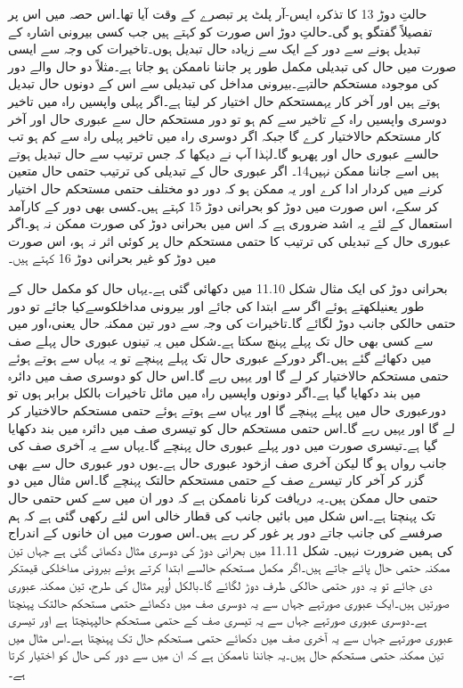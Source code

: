 	حالتِ دوڑ 13 کا تذکرہ ایس-آر پلٹ پر تبصرے کے وقت آیا تھا۔اس حصہ میں اس پر تفصیلاً گفتگو ہو گی۔حالتِ دوڑ اس صورت کو کہتے ہیں جب کسی بیرونی اشارہ کے تبدیل ہونے سے دور کے ایک سے زیادہ حال تبدیل ہوں۔تاخیرات کی وجہ سے ایسی صورت میں حال  کی تبدیلی مکمل طور پر جاننا ناممکن ہو جاتا ہے۔مثلاً دو حال  والے دور کی موجودہ مستحکم حالتہے۔بیرونی مداخل کی تبدیلی  سے اس کے دونوں حال تبدیل ہوتے ہیں اور آخر کار یہمستحکم حال اختیار کر لیتا ہے۔اگر پہلی واپسیں راہ میں تاخیر دوسری واپسیں راہ کے تاخیر سے کم ہو تو دور مستحکم حال سے عبوری حال  اور آخر کار مستحکم حالاختیار کرے گا جبکہ اگر دوسری راہ میں تاخیر پہلی راہ سے کم ہو تب حالسے عبوری حال اور پھرہو گا۔لہٰذا آپ نے دیکھا کہ جس ترتیب سے حال تبدیل ہوتے ہیں اسے جاننا ممکن نہیں14۔
	اگر عبوری حال   کے تبدیلی کی ترتیب حتمی حال متعین کرنے میں کردار ادا کرے اور یہ ممکن ہو کہ دور دو مختلف حتمی مستحکم حال اختیار کر سکے، اس صورت میں دوڑ کو بحرانی دوڑ 15 کہتے ہیں۔کسی بھی دور کے کارآمد استعمال کے لئے یہ اشد ضروری ہے کہ اس میں بحرانی دوڑ کی صورت ممکن نہ ہو۔اگر عبوری حال  کے تبدیلی کی ترتیب کا حتمی مستحکم حال پر کوئی اثر نہ ہو، اس صورت میں دوڑ کو غیر بحرانی دوڑ 16 کہتے ہیں۔



	بحرانی دوڑ کی ایک مثال شکل 11.10 میں دکھائی گئی ہے۔یہاں حال کو مکمل حال کے طور یعنیلکھتے ہوئے اگر سے ابتدا کی جائے اور بیرونی مداخلکوسےکیا جائے تو دور حتمی حالکی جانب دوڑ لگائے گا۔تاخیرات کی وجہ سے دور تین ممکنہ حال  یعنی،اور میں سے کسی بھی حال تک پہلے پہنچ سکتا ہے۔شکل میں یہ تینوں عبوری حال  پہلے صف میں دکھائے گئے ہیں۔اگر دورکے عبوری حال  تک پہلے پہنچے تو یہ یہاں سے ہوتے ہوئے حتمی مستحکم حالاختیار کر لے گا اور یہیں رہے گا۔اس حال کو دوسری صف میں دائرہ میں بند دکھایا گیا ہے۔اگر دونوں واپسیں راہ میں مائل تاخیرات بالکل برابر ہوں تو دورعبوری حال  میں پہلے پہنچے گا اور یہاں سے ہوتے ہوئے حتمی مستحکم حالاختیار کر لے گا اور یہیں رہے گا۔اس حتمی مستحکم حال کو تیسری صف میں دائرہ میں بند دکھایا گیا ہے۔تیسری صورت میں دور پہلے عبوری حال پہنچے گا۔یہاں سے یہ آخری صف کی جانب رواں ہو گا لیکن آخری صف ازخود عبوری حال ہے۔یوں دور عبوری حال سے بھی گزر کر آخر کار تیسرے صف کے حتمی مستحکم حالتک پہنچے گا۔اس مثال میں دو حتمی حال ممکن ہیں۔یہ دریافت کرنا ناممکن ہے کہ دور ان میں سے کس حتمی حال تک پہنچتا ہے۔اس شکل میں بائیں جانب کی قطار خالی اس لئے رکھی گئی ہے کہ ہم صرفسے کی جانب جاتے دور پر غور کر رہے ہیں۔اس صورت میں ان خانوں کے اندراج کی ہمیں ضرورت نہیں۔
	شکل 11.11 میں بحرانی دوڑ کی دوسری مثال دکھائی گئی ہے جہاں تین ممکنہ حتمی حال پائے جاتے ہیں۔اگر مکمل مستحکم حالسے ابتدا کرتے ہوئے بیرونی مداخلکی قیمتکر دی جائے تو یہ دور حتمی حالکی طرف دوڑ لگائے گا۔بالکل اُوپر مثال کی طرح، تین ممکنہ عبوری صورتیں ہیں۔ایک عبوری صورتہے جہاں سے یہ دوسری صف میں دکھائے حتمی مستحکم حالتک پہنچتا ہے۔دوسری عبوری صورتہے جہاں سے یہ تیسری صف کے حتمی مستحکم حالپہنچتا ہے اور تیسری عبوری صورتہے جہاں سے یہ آخری صف میں دکھائے حتمی مستحکم حال تک پہنچتا ہے۔اس مثال میں تین ممکنہ حتمی مستحکم حال ہیں۔یہ جاننا ناممکن ہے  کہ ان میں سے دور کس حال کو اختیار کرتا ہے۔


